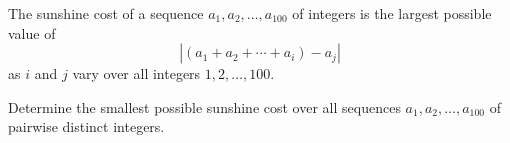 The sunshine cost of a sequence $a_1,a_2,\ldots,a_{100}$ of integers is the largest possible value of
\[
\left|(a_1+a_2+\cdots+a_i)-a_j\right|
\]
as $i$ and $j$ vary over all integers $1,2,\ldots,100$.

Determine the smallest possible sunshine cost over all sequences $a_1,a_2,\ldots,a_{100}$ of pairwise distinct integers.
